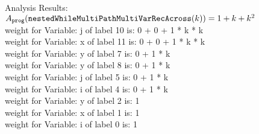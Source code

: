                                     Analysis Results: $ A_{\mathtt{prog}}(\mathtt{nestedWhileMultiPathMultiVarRecAcross}(k)) = 1 + k + k^2$
                                    \\
                                    weight for Variable: j of label 10 is: 0 + 0 + 1 * k * k \\
                                    weight for Variable: x of label 11 is: 0 + 0 + 1 * k * k \\
                                    weight for Variable: y of label 7 is: 0 + 1 * k \\
                                    weight for Variable: y of label 8 is: 0 + 1 * k \\
                                    weight for Variable: j of label 5 is: 0 + 1 * k \\
                                    weight for Variable: i of label 4 is: 0 + 1 * k \\
                                    weight for Variable: y of label 2 is: 1 \\
                                    weight for Variable: x of label 1 is: 1 \\
                                    weight for Variable: i of label 0 is: 1 \\


